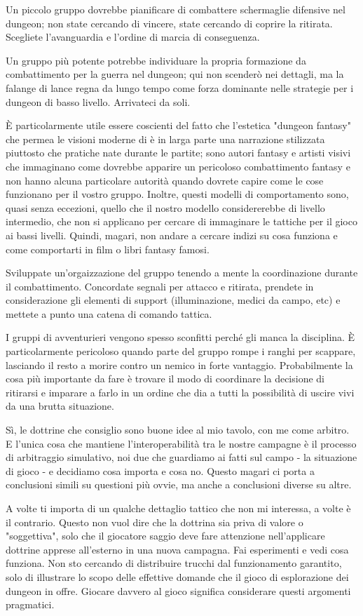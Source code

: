 
Un piccolo gruppo dovrebbe pianificare di combattere schermaglie difensive nel dungeon; non state cercando di vincere, state cercando di coprire la ritirata. Scegliete l'avanguardia e l'ordine di marcia di conseguenza.

Un gruppo più potente potrebbe individuare la propria formazione da combattimento per la guerra nel dungeon; qui non scenderò nei dettagli, ma la falange di lance regna da lungo tempo come forza dominante nelle strategie per i dungeon di basso livello. Arrivateci da soli.

È particolarmente utile essere coscienti del fatto che l'estetica "dungeon fantasy" che permea le visioni moderne di \dnd è in larga parte una narrazione stilizzata piuttosto che pratiche nate durante le partite; sono autori fantasy e artisti visivi che immaginano come dovrebbe apparire un pericoloso combattimento fantasy e non hanno alcuna particolare autorità quando dovrete capire come le cose funzionano per il vostro gruppo. Inoltre, questi modelli di comportamento sono, quasi senza eccezioni, quello che il nostro modello considererebbe di livello intermedio, che non si applicano per cercare di immaginare le tattiche per il gioco ai bassi livelli. Quindi, magari, non andare a cercare indizi su cosa funziona e come comportarti in film o libri fantasy famosi.

Sviluppate un'orgaizzazione del gruppo tenendo a mente la coordinazione durante il combattimento. Concordate segnali per attacco e ritirata, prendete in considerazione gli elementi di support (illuminazione, medici da campo, etc) e mettete a punto una catena di comando tattica.

I gruppi di avventurieri vengono spesso sconfitti perché gli manca la disciplina. È particolarmente pericoloso quando parte del gruppo rompe i ranghi per scappare, lasciando il resto a morire contro un nemico in forte vantaggio. Probabilmente la cosa più importante da fare è trovare il modo di coordinare la decisione di ritirarsi e imparare a farlo in un ordine che dia a tutti la possibilità di uscire vivi da una brutta situazione.


Sì, le dottrine che consiglio sono buone idee al mio tavolo, con me come arbitro. E l'unica cosa che mantiene l'interoperabilità tra le nostre campagne è il processo di arbitraggio simulativo, noi due che guardiamo ai fatti sul campo - la situazione di gioco - e decidiamo cosa importa e cosa no. Questo magari ci porta a conclusioni simili su questioni più ovvie, ma anche a conclusioni diverse su altre.

A volte ti importa di un qualche dettaglio tattico che non mi interessa, a volte è il contrario. Questo non vuol dire che la dottrina sia priva di valore o "soggettiva", solo che il giocatore saggio deve fare attenzione nell'applicare dottrine apprese all'esterno in una nuova campagna. Fai esperimenti e vedi cosa funziona. Non sto cercando di distribuire trucchi dal funzionamento garantito, solo di illustrare lo scopo delle effettive domande che il gioco di esplorazione dei dungeon in \dnd offre. Giocare davvero al gioco significa considerare questi argomenti pragmatici.
